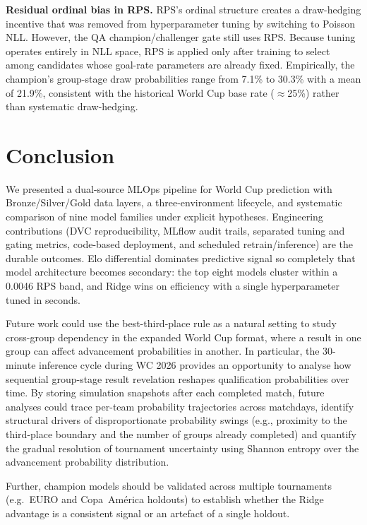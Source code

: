 \documentclass[conference]{IEEEtran}
\begin{document}
\textbf{Residual ordinal bias in RPS.}
RPS's ordinal structure creates a draw-hedging incentive that was removed
from hyperparameter tuning by switching to Poisson NLL\@.
However, the QA champion/challenger gate still uses RPS\@.
Because tuning operates entirely in NLL space, RPS is applied only after
training to select among candidates whose goal-rate parameters are already
fixed.
Empirically, the champion's group-stage draw probabilities range from
7.1\% to 30.3\% with a mean of 21.9\%, consistent with the historical
World Cup base rate (${\approx}$25\%) rather than systematic draw-hedging.

\section{Conclusion}
\label{sec:conclusion}

We presented a dual-source MLOps pipeline for World Cup prediction with
Bronze/Silver/Gold data layers, a three-environment lifecycle, and systematic
comparison of nine model families under explicit hypotheses.
Engineering contributions (DVC reproducibility, MLflow audit trails,
separated tuning and gating metrics, code-based deployment, and scheduled
retrain/inference) are the durable outcomes.
Elo differential dominates predictive signal so completely that model
architecture becomes secondary: the top eight models cluster within a
0.0046 RPS band, and Ridge wins on efficiency with a single hyperparameter
tuned in seconds.

Future work could use the best-third-place rule as a natural setting to study cross-group dependency in the expanded World Cup format, where a result in one group can affect advancement probabilities in another. In particular, the 30-minute inference cycle during WC 2026 provides an opportunity to analyse how sequential group-stage result revelation reshapes qualification probabilities over time. By storing simulation snapshots after each completed match, future analyses could trace per-team probability trajectories across matchdays, identify structural drivers of disproportionate probability swings (e.g., proximity to the third-place boundary and the number of groups already completed) and quantify the gradual resolution of tournament uncertainty using Shannon entropy over the advancement probability distribution.

Further, champion models should be validated across multiple tournaments (e.g.\
EURO and Copa~Am\'erica holdouts) to establish whether the Ridge advantage
is a consistent signal or an artefact of a single holdout.



\end{document}
